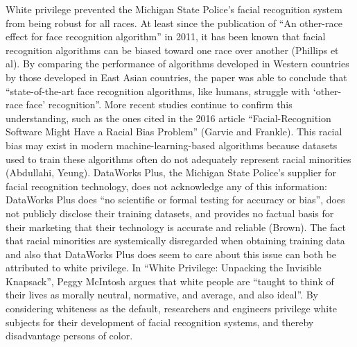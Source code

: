 \documentclass[12pt, letterpaper]{article}
\begin{document}
\begin{mla}
White privilege prevented the Michigan State Police's facial recognition
system from being robust for all races. At least since the publication of ``An
other-race effect for face recognition algorithm'' in 2011, it has been known
that facial recognition algorithms can be biased toward one race over another
(Phillips et al). By comparing the performance of algorithms developed in
Western countries by those developed in East Asian countries, the paper was
able to conclude that ``state-of-the-art face recognition algorithms, like
humans, struggle with `other-race face' recognition''. More recent studies
continue to confirm this understanding, such as the ones cited in the 2016
article ``Facial-Recognition Software Might Have a Racial Bias Problem''
(Garvie and Frankle). This racial bias may exist in modern
machine-learning-based algorithms because datasets used to train these
algorithms often do not adequately represent racial minorities
(Abdullahi, Yeung). DataWorks Plus, the Michigan State Police's supplier for
facial recognition technology, does not acknowledge any of this information:
DataWorks Plus does ``no scientific or formal testing for accuracy or bias'',
does not publicly disclose their training datasets, and provides no factual
basis for their marketing that their technology is accurate and reliable
(Brown). The fact that racial minorities are systemically disregarded when
obtaining training data and also that DataWorks Plus does seem to care about
this issue can both be attributed to white privilege. In ``White Privilege:
Unpacking the Invisible Knapsack'', Peggy McIntosh argues that white people
are ``taught to think of their lives as morally neutral, normative, and
average, and also ideal''. By considering whiteness as the default,
researchers and engineers privilege white subjects for their development of
facial recognition systems, and thereby disadvantage persons of color.


\end{mla}
\end{document}
